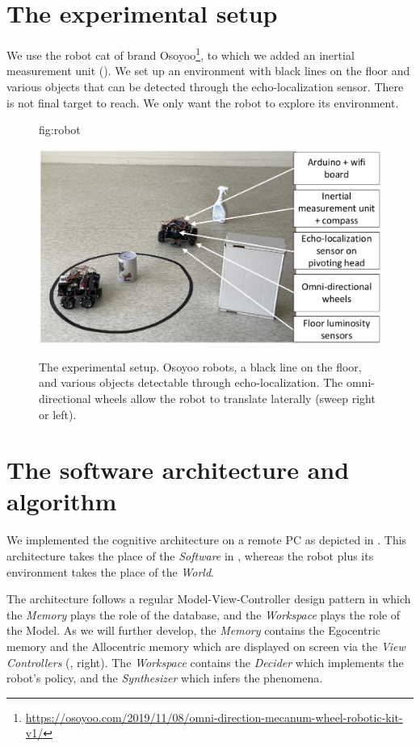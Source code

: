 \documentclass[pmlr]{jmlr}%
\begin{document}
\section{The experimental setup}
\label{sec:experiment}

We use the robot cat of brand Osoyoo\footnote{\url{https://osoyoo.com/2019/11/08/omni-direction-mecanum-wheel-robotic-kit-v1/}}, to which we added an inertial measurement unit (). 
We set up an environment with black lines on the floor and various objects that can be detected through the echo-localization sensor. 
There is not final target to reach. We only want the robot to explore its environment. 

\begin{figure}[htbp]
	\floatconts
	{fig:robot}
	{\caption{The experimental setup. 
			Osoyoo robots, a black line on the floor, and various objects detectable through echo-localization.
		    The omni-directional wheels allow the robot to translate laterally (sweep right or left).}}
	{\includegraphics[width=0.8\linewidth]{images/Figure_1_Robotb}}
\end{figure}


\section{The software architecture and algorithm}
\label{sec:software}

We implemented the cognitive architecture on a remote PC as depicted in . 
This architecture takes the place of the \textit{Software} in , whereas the robot plus its environment takes the place of the \textit{World}.

The architecture follows a regular Model-View-Controller design pattern in which the \textit{Memory} plays the role of the database, and the \textit{Workspace} plays the role of the Model. 
As we will further develop, the \textit{Memory} contains the Egocentric memory and the Allocentric memory which are displayed on screen via the \textit{View Controllers} (, right).
The \textit{Workspace} contains the \textit{Decider} which implements the robot's policy, and the \textit{Synthesizer} which infers the phenomena. 
\end{document}
